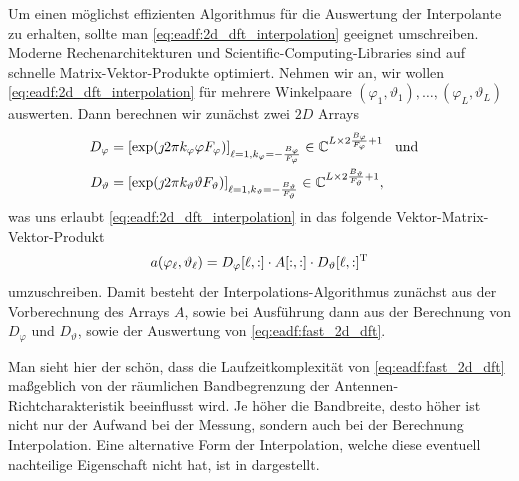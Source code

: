 Um einen möglichst effizienten Algorithmus für die Auswertung der Interpolante zu erhalten, sollte man \eqref{eq:eadf:2d_dft_interpolation} geeignet umschreiben.
Moderne Rechenarchitekturen und Scientific-Computing-Libraries sind auf schnelle Matrix-Vektor-Produkte optimiert.
Nehmen wir an, wir wollen \eqref{eq:eadf:2d_dft_interpolation} für mehrere Winkelpaare $(\varphi_1, \vartheta_1), \dots, (\varphi_L, \vartheta_L)$ auswerten.
Dann berechnen wir zunächst zwei $2D$ Arrays
\begin{align}
    D_\varphi &= [\exp(\jmath 2 \pi k_\varphi \varphi F_\varphi)]_{\ell = 1, k_\varphi=-\frac{B_\varphi}{F_\varphi}} \in \mathbb{C}^{L \times 2 \frac{B_\varphi}{F_\varphi} + 1} {\hspace{3mm} \text{und} \hspace{3mm}}\\
    D_\vartheta &= [\exp(\jmath 2 \pi k_\vartheta \vartheta F_\vartheta)]_{\ell = 1, k_\vartheta=-\frac{B_\vartheta}{F_\vartheta}} \in \mathbb{C}^{L \times 2 \frac{B_\vartheta}{F_\vartheta} + 1}, 
\end{align}
was uns erlaubt \eqref{eq:eadf:2d_dft_interpolation} in das folgende Vektor-Matrix-Vektor-Produkt
\begin{equation}\label{eq:eadf:fast_2d_dft}
    a(\varphi_\ell, \vartheta_\ell) = 
        D_\varphi[\ell, :] \cdot A[:,:] \cdot D_\vartheta[\ell, :]^{\mathrm{T}}
\end{equation}
umzuschreiben.
Damit besteht der Interpolations-Algorithmus zunächst aus der Vorberechnung des Arrays $A$, sowie bei Ausführung dann aus der Berechnung von $D_\varphi$ und $D_\vartheta$, sowie der Auswertung von \eqref{eq:eadf:fast_2d_dft}.

Man sieht hier der schön, dass die Laufzeitkomplexität von \eqref{eq:eadf:fast_2d_dft} maßgeblich von der räumlichen Bandbegrenzung der Antennen-Richtcharakteristik beeinflusst wird.
Je höher die Bandbreite, desto höher ist nicht nur der Aufwand bei der Messung, sondern auch bei der Berechnung Interpolation.
Eine alternative Form der Interpolation, welche diese eventuell nachteilige Eigenschaft nicht hat, ist in  dargestellt.
